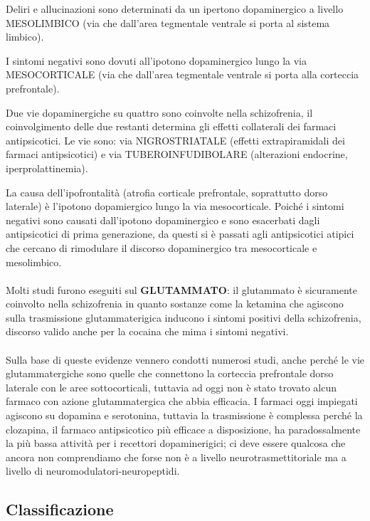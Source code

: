 Deliri e allucinazioni sono determinati da un ipertono dopaminergico a
livello MESOLIMBICO (via che dall'area tegmentale ventrale si porta al
sistema limbico).

I sintomi negativi sono dovuti all'ipotono dopaminergico lungo la via
MESOCORTICALE (via che dall'area tegmentale ventrale si porta alla
corteccia prefrontale).

Due vie dopaminergiche su quattro sono coinvolte nella schizofrenia, il
coinvolgimento delle due restanti determina gli effetti collaterali dei
farmaci antipsicotici. Le vie sono: via NIGROSTRIATALE (effetti
extrapiramidali dei farmaci antipsicotici) e via TUBEROINFUDIBOLARE
(alterazioni endocrine, iperprolattinemia).

La causa dell'ipofrontalità (atrofia corticale prefrontale, soprattutto
dorso laterale) è l'ipotono dopamiergico lungo la via mesocorticale.
Poiché i sintomi negativi sono causati dall'ipotono dopaminergico e sono
esacerbati dagli antipsicotici di prima generazione, da questi si è
passati agli antipsicotici atipici che cercano di rimodulare il discorso
dopaminergico tra mesocorticale e mesolimbico.
\\\\
Molti studi furono eseguiti sul \textbf{GLUTAMMATO}: il glutammato è
sicuramente coinvolto nella schizofrenia in quanto sostanze come la
ketamina che agiscono sulla trasmissione glutammaterigica inducono i
sintomi positivi della schizofrenia, discorso valido anche per la
cocaina che mima i sintomi negativi.
\\\\
Sulla base di queste evidenze vennero condotti numerosi studi, anche
perché le vie glutammatergiche sono quelle che connettono la corteccia
prefrontale dorso laterale con le aree sottocorticali, tuttavia ad oggi
non è stato trovato alcun farmaco con azione glutammatergica che abbia
efficacia. I farmaci oggi impiegati agiscono su dopamina e serotonina,
tuttavia la trasmissione è complessa perché la clozapina, il farmaco
antipsicotico più efficace a disposizione, ha paradossalmente la più
bassa attività per i recettori dopaminerigici; ci deve essere qualcosa
che ancora non comprendiamo che forse non è a livello
neurotrasmettitoriale ma a livello di neuromodulatori-neuropeptidi.

\subsection{Classificazione}

